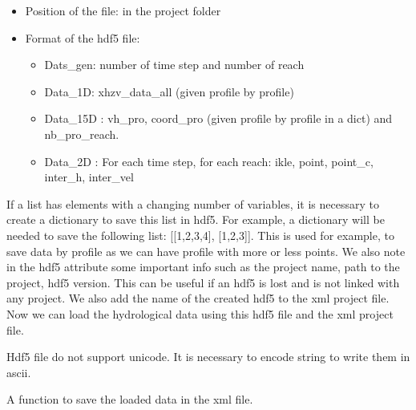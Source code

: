 \documentclass[letterpaper,10pt,english]{sphinxmanual}
\begin{document}
\begin{fulllineitems}
\begin{fulllineitems}
\begin{itemize}
\item {} 
Position of the file: in the project folder

\item {} 
Format of the hdf5 file:
\begin{itemize}
\item {} 
Dats\_gen:  number of time step and number of reach

\item {} 
Data\_1D:  xhzv\_data\_all (given profile by profile)

\item {} 
Data\_15D :  vh\_pro, coord\_pro (given profile by profile in a dict) and nb\_pro\_reach.

\item {} 
Data\_2D : For each time step, for each reach: ikle, point, point\_c, inter\_h, inter\_vel

\end{itemize}

\end{itemize}

If a list has elements with a changing number of variables, it is necessary to create a dictionary to save
this list in hdf5. For example, a dictionary will be needed to save the following list: {[}{[}1,2,3,4{]}, {[}1,2,3{]}{]}.
This is used for example, to save data by profile as we can have profile with more or less points. We also note
in the hdf5 attribute some important info such as the project name, path to the project, hdf5 version.
This can be useful if an hdf5 is lost and is not linked with any project. We also add the name of the created
hdf5 to the xml project file. Now we can load the hydrological data using this hdf5 file and the xml project file.

Hdf5 file do not support unicode. It is necessary to encode string to write them in ascii.

\end{fulllineitems}


\begin{fulllineitems}
\label{\detokenize{index:src_GUI.hydro_GUI_2.SubHydroW.save_xml}}
A function to save the loaded data in the xml file.


\end{fulllineitems}
\end{fulllineitems}
\end{document}
